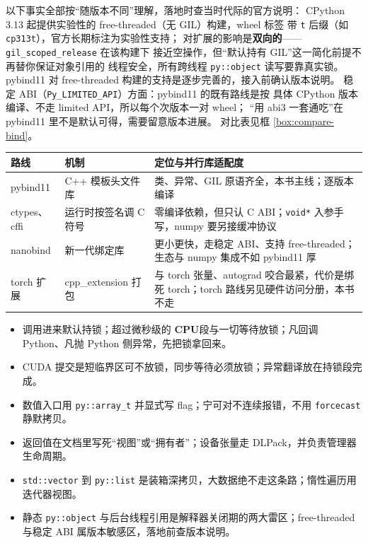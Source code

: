 \documentclass[12pt,a4paper,fontset=fandol]{ctexbook}
\newcommand{\Tp}[1]{\texttt{#1}}
\newcommand{\Dom}[1]{\textsf{\bfseries #1}}
\newcommand{\CPU}{\Dom{CPU}}
\begin{document}
以下事实全部按``随版本不同''理解，落地时查当时代际的官方说明：
CPython 3.13 起提供实验性的 free-threaded（无 GIL）构建，wheel 标签
带 \Tp{t} 后缀（如 \Tp{cp313t}），官方长期标注为实验性支持；
对扩展的影响是\textbf{双向的}——\Tp{gil\_scoped\_release} 在该构建下
接近空操作，但``默认持有 GIL''这一简化前提不再替你保证对象引用的
线程安全，所有跨线程 \Tp{py::object} 读写要靠真实锁。pybind11 对
free-threaded 构建的支持是逐步完善的，接入前确认版本说明。
稳定 ABI（\Tp{Py\_LIMITED\_API}）方面：pybind11 的既有路线是按
具体 CPython 版本编译、不走 limited API，所以每个次版本一对 wheel；
``用 abi3 一套通吃''在 pybind11 里不是默认可得，需要留意版本进展。
对比表见框 \ref{box:compare-bind}。

\begin{compare}[title={四种把 C++ 并行库递给 Python 的路子},label={box:compare-bind}]
\begin{tabular}{@{}>{\raggedright\arraybackslash}p{}
  >{\raggedright\arraybackslash}p{}
  >{\raggedright\arraybackslash}p{}@{}}
路线 & 机制 & 定位与并行库适配度 \\
\midrule
pybind11 & C++ 模板头文件库 & 类、异常、GIL 原语齐全，本书主线；逐版本编译 \\
ctypes、cffi & 运行时按签名调 C 符号 & 零编译依赖，但只认 C ABI；\Tp{void*} 入参手写，numpy 要另接缓冲协议 \\
nanobind & 新一代绑定库 & 更小更快，走稳定 ABI、支持 free-threaded；生态与 numpy 集成不如 pybind11 厚 \\
torch 扩展 & cpp\_extension 打包 & 与 torch 张量、autograd 咬合最紧，代价是绑死 torch；torch 路线另见硬件访问分册，本书不走 \\
\end{tabular}
\end{compare}

\begin{guideline}[title={本章要点}]
\begin{itemize}
\item 调用进来默认持锁；超过微秒级的 \CPU{}段与一切等待放锁；凡回调 Python、凡抛 Python 侧异常，先把锁拿回来。
\item CUDA 提交是短临界区可不放锁，同步等待必须放锁；异常翻译放在持锁段完成。
\item 数值入口用 \Tp{py::array\_t} 并显式写 flag；宁可对不连续报错，不用 \Tp{forcecast} 静默拷贝。
\item 返回值在文档里写死``视图''或``拥有者''；设备张量走 DLPack，并负责管理器生命周期。
\item \Tp{std::vector} 到 \Tp{py::list} 是装箱深拷贝，大数据绝不走这条路；惰性遍历用迭代器视图。
\item 静态 \Tp{py::object} 与后台线程引用是解释器关闭期的两大雷区；free-threaded 与稳定 ABI 属版本敏感区，落地前查版本说明。
\end{itemize}
\end{guideline}
\end{document}
